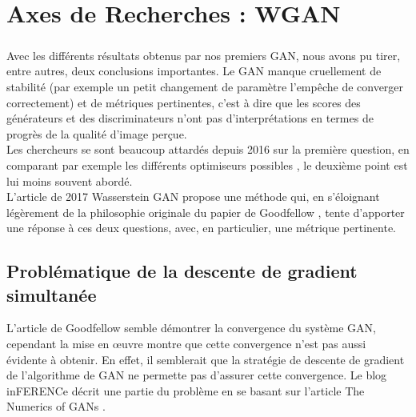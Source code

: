 

\chapter{Axes de Recherches : WGAN}

\paragraph*{} Avec les différents résultats obtenus par nos premiers GAN, nous avons pu tirer, entre autres, deux conclusions importantes. Le GAN manque cruellement de stabilité (par exemple un petit changement de paramètre l'empêche de converger correctement) et de métriques pertinentes, c'est à dire que les scores des générateurs et des discriminateurs n'ont pas d'interprétations en termes de progrès de la qualité d'image perçue.\\
Les chercheurs se sont beaucoup attardés depuis 2016 sur la première question, en comparant par exemple les différents optimiseurs possibles \cite{optimiser}, le deuxième point est lui moins souvent abordé. \\
L'article de 2017 Wasserstein GAN \cite{wgan} propose une méthode qui, en s'éloignant légèrement de la philosophie originale du papier de Goodfellow \cite{Goodfellow-et-al-2016}, tente d'apporter une réponse à ces deux questions, avec, en particulier, une métrique pertinente.

\section{Problématique de la descente de gradient simultanée}

L'article de Goodfellow semble démontrer la convergence du système GAN, cependant la mise en œuvre montre que cette convergence n'est pas aussi évidente à obtenir. En effet, il semblerait que la stratégie de descente de gradient de l'algorithme de GAN ne permette pas d'assurer cette convergence. Le blog inFERENCe \cite{conservative-field} décrit une partie du problème en se basant sur l'article The Numerics of GANs \cite{numerics-gan}.

